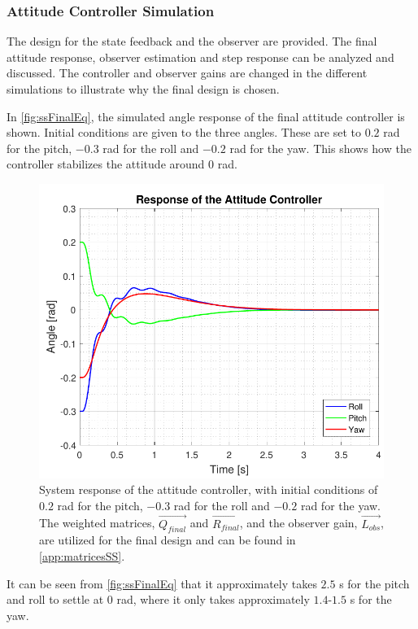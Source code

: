 \subsubsection{Attitude Controller Simulation}\label{sec:AttSim}
The design for the state feedback and the observer are provided. The final attitude response, observer estimation and step response can be analyzed and discussed. The controller and observer gains are changed in the different simulations to illustrate why the final design is chosen.


In \autoref{fig:ssFinalEq}, the simulated angle response of the final attitude controller is shown. Initial conditions are given to the three angles. These are set to $0.2$ rad for the pitch, $-0.3$ rad for the roll and $-0.2$ rad for the yaw. This shows how the controller stabilizes the attitude around 0 rad.
%
\begin{figure}[H]
	\centering
	\includegraphics[scale=0.75]{figures/ssFinalEq.pdf}
	\caption{System response of the attitude controller, with initial conditions of $0.2$ rad for the pitch, $-0.3$ rad for the roll and $-0.2$ rad for the yaw. The weighted matrices, $\vec{Q_{final}}$ and $\vec{R_{final}}$, and the observer gain, $\vec{L_{obs}}$, are utilized for the final design and can be found in \autoref{app:matricesSS}.}
	\label{fig:ssFinalEq}
\end{figure}
%
It can be seen from \autoref{fig:ssFinalEq} that it approximately takes $2.5$ \si{s} for the pitch and roll to settle at 0 rad, where it only takes approximately $1.4$-$1.5$ \si{s} for the yaw.

